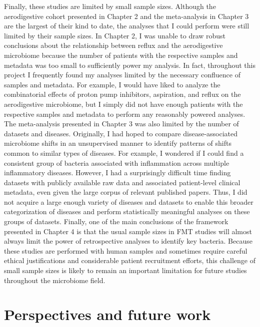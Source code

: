 Finally, these studies are limited by small sample sizes.
Although the aerodigestive cohort presented in Chapter 2 and the meta-analysis in Chapter 3 are the largest of their kind to date, the analyses that I could perform were still limited by their sample sizes.
In Chapter 2, I was unable to draw robust conclusions about the relationship between reflux and the aerodigestive microbiome because the number of patients with the respective samples and metadata was too small to sufficiently power my analysis.
In fact, throughout this project I frequently found my analyses limited by the necessary confluence of samples and metadata.
For example, I would have liked to analyze the combinatorial effects of proton pump inhibitors, aspiration, and reflux on the aerodigestive microbiome, but I simply did not have enough patients with the respective samples and metadata to perform any reasonably powered analyses.
The meta-analysis presented in Chapter 3 was also limited by the number of datasets and diseases.
Originally, I had hoped to compare disease-associated microbiome shifts in an unsupervised manner to identify patterns of shifts common to similar types of diseases.
For example, I wondered if I could find a consistent group of bacteria associated with inflammation across multiple inflammatory diseases.
However, I had a surprisingly difficult time finding datasets with publicly available raw data and associated patient-level clinical metadata, even given the large corpus of relevant published papers.
Thus, I did not acquire a large enough variety of diseases and datasets to enable this broader categorization of diseases and perform statistically meaningful analyses on these groups of datasets.
Finally, one of the main conclusions of the framework presented in Chapter 4 is that the usual sample sizes in FMT studies will almost always limit the power of retrospective analyses to identify key bacteria.
Because these studies are performed with human samples and sometimes require careful ethical justifications and considerable patient recruitment efforts, this challenge of small sample sizes is likely to remain an important limitation for future studies throughout the microbiome field.

\section{Perspectives and future work}


